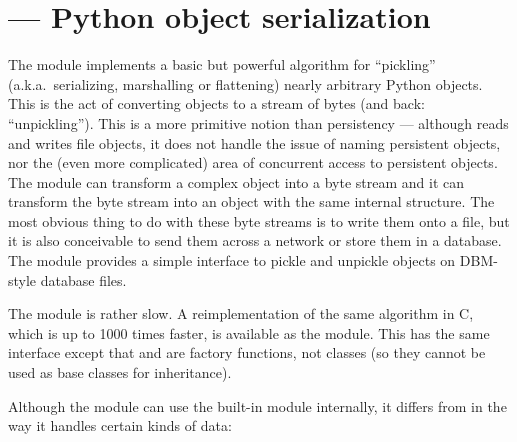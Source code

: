 \section{ ---
         Python object serialization}




The  module implements a basic but powerful algorithm
for ``pickling'' (a.k.a.\ serializing, marshalling or flattening)
nearly arbitrary Python objects.  This is the act of converting
objects to a stream of bytes (and back: ``unpickling'').  This is a
more primitive notion than persistency --- although 
reads and writes file objects, it does not handle the issue of naming
persistent objects, nor the (even more complicated) area of concurrent
access to persistent objects.  The  module can
transform a complex object into a byte stream and it can transform the
byte stream into an object with the same internal structure.  The most
obvious thing to do with these byte streams is to write them onto a
file, but it is also conceivable to send them across a network or
store them in a database.  The module
 provides a simple interface
to pickle and unpickle objects on DBM-style database files.


 The  module is rather slow.  A
reimplementation of the same algorithm in C, which is up to 1000 times
faster, is available as the
 module.  This has the same
interface except that  and  are
factory functions, not classes (so they cannot be used as base classes
for inheritance).

Although the  module can use the built-in module
 internally, it differs from 
 in the way it handles certain kinds of data:

